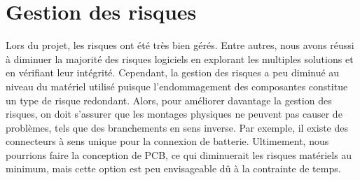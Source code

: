 \section{Gestion des risques}
Lors du projet, les risques ont été très bien gérés. Entre autres, nous avons réussi à diminuer la majorité des risques logiciels en explorant les multiples solutions et en vérifiant leur intégrité. Cependant, la gestion des risques a peu diminué au niveau du matériel utilisé puisque l'endommagement des composantes constitue un type de risque redondant. Alors, pour améliorer davantage la gestion des risques, on doit s'assurer que les montages physiques ne peuvent pas causer de problèmes, tels que des branchements en sens inverse. Par exemple, il existe des connecteurs à sens unique pour la connexion de batterie. Ultimement, nous pourrions faire la conception de PCB, ce qui diminuerait les risques matériels au minimum, mais cette option est peu envisageable dû à la contrainte de temps.

